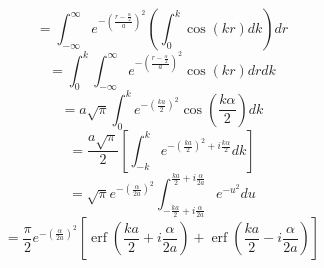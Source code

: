 \documentclass[letterpaper,twocolumn,amsmath,amssymb,prb]{revtex4-1}
\begin{document}
\begin{widetext}
\begin{displaymath}{=\int_{-\infty}^{\infty}{e^{-\left(\frac{r-\frac{\alpha}{2}}{a}\right)^2}\left(\int_{0}^{k}{\cos(kr)d{k}}\right)d{r}}}\end{displaymath} 
\begin{displaymath}{=\int_{0}^{k}\int_{-\infty}^{\infty}{e^{-\left(\frac{r-\frac{\alpha}{2}}{a}\right)^2}{\cos(kr)d{r}}d{k}}}\end{displaymath} 
\begin{displaymath}{=a\sqrt{\pi}\int_{0}^{k}e^{-\left(\frac{ka}{2}\right)^2}\cos\left(\frac{k\alpha}{2}\right)d{k} }\end{displaymath} 
\begin{displaymath}{=\frac{a\sqrt{\pi}}{2}\left[\int_{-k}^{k}e^{-\left(\frac{ka}{2}\right)^2 + i\frac{k\alpha}{2}}d{k}\right]}\end{displaymath} 
\begin{displaymath}{=\sqrt{\pi}e^{-\left(\frac{\alpha}{2a}\right)^2}\int_{-\frac{ka}{2}+i\frac{\alpha}{2a}}^{\frac{ka}{2}+i\frac{\alpha}{2a}}e^{-u^2}d{u}}\end{displaymath} 
\begin{equation}{=\frac{\pi}{2}e^{-\left(\frac{\alpha}{2a}\right)^2}\left[\operatorname{erf}\left(\frac{ka}{2}+i\frac{\alpha}{2a}\right)+\operatorname{erf}\left(\frac{ka}{2}-i\frac{\alpha}{2a}\right)\right]}\end{equation} 
\[{}\]
\[{}\]


\end{widetext}
\end{document}
